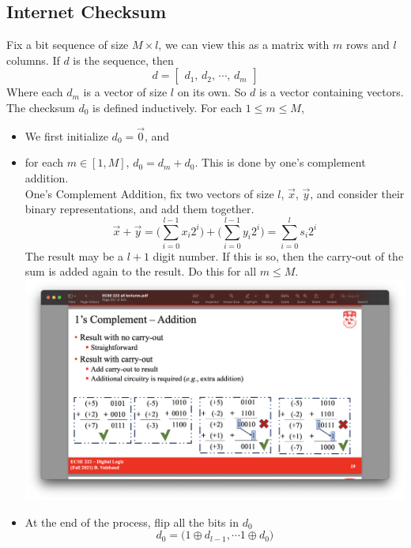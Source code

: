 \documentclass[../../main.tex]{subfiles}
\begin{document}
\subsection{Internet Checksum}
\begin{definition}
    Fix a bit sequence of size $M\times l$, we can view this as a matrix with $m$ rows and $l$ columns. If $d$ is the sequence, then
    \[d = \begin{bmatrix}d_1,\, d_2,\,\cdots,\,d_m\end{bmatrix}\]
    Where each $d_m$ is a vector of size $l$ on its own. So $d$ is a vector containing vectors.\\
    
    The checksum $d_0$ is defined inductively. For each $1\leq m\leq M$,
    \begin{itemize}
        \item We first initialize $d_0 = \vec{0}$, and
        \item for each $m\in[1,M]$, $d_0 = d_m + d_0$. This is done by one's complement addition.\\
        
        One's Complement Addition, fix two vectors of size $l$, $\vec{x}$, $\vec{y}$, and consider their binary representations, and add them together.
        \[
        \vec{x} + \vec{y} = \biggl(\sum_{i=0}^{l-1} x_i 2^i\biggr) + \biggl(\sum_{i=0}^{l-1} y_i 2^i\biggr) = \sum_{i=0}^{l} s_i 2^i
        \]
        The result may be a $l+1$ digit number. If this is so, then the carry-out of the sum is added again to the result. Do this for all $m\leq M$.\\
        \includegraphics[width=\textwidth]{images/ones_complement_addition.png}
        \item At the end of the process, flip all the bits in $d_0$
        \[
        d_0 = \biggl(1\oplus d_{l-1},\cdots 1\oplus d_{0}\biggr)
        \]
    \end{itemize}
\end{definition}
\end{document}
